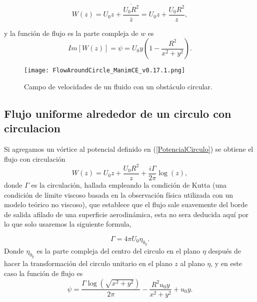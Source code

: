 \documentclass[12pt]{article}
\begin{document}
		\begin{equation}
			W(z) = U_0 z + \frac{\overline{U_0 R^2} }{\overline{z} } = U_0 z +\frac{U_0 R^2}{z} ,
			\label{PotencialCirculo}
		\end{equation}

		\noindent y la función de flujo es la parte compleja de $w$ es
		\begin{equation*}
			Im[W(z)]=\psi =  U_0 y \left( 1- \frac{R^2}{x^2 + y^2}\right).
			\label{Potencial}
		\end{equation*}
		\begin{figure}[H]
			\begin{small}
				\begin{center}
					\texttt{[image: FlowAroundCircle\_ManimCE\_v0.17.1.png]}
				\end{center}
				\caption{Campo de velocidades de un fluido con un obstáculo circular.}
			\end{small}
		\end{figure}
		
		\subsection{Flujo uniforme alrededor de un circulo con circulacion}
			Si agregamos un vórtice al potencial definido en (\ref{PotencialCirculo}) se obtiene el flujo con circulación
			\begin{equation}
				W(z) = U_0z + \frac{ U_0R^2}{z} + \frac{i \Gamma}{2 \pi}\log (z),
			\end{equation}
			donde  $\Gamma$ es la circulación, hallada empleando la condición de Kutta (una condición de límite viscoso basada en la observación física utilizada con un modelo teórico no viscoso), que establece que el flujo sale suavemente del borde de salida afilado de una superficie aerodinámica, esta no sera deducida aquí por lo que solo usaremos la siguiente formula,

			\begin{equation*}
				\Gamma=4 \pi U_0 \eta_{0_y}.
			\end{equation*}
			Donde $\eta_{0_y}$ es la parte compleja del centro del circulo en el plano $\eta$ después de hacer la transformación del circulo unitario en el plano $z$ al plano $\eta$, y en este caso la función de flujo es 
			\begin{equation*}
				\psi = \frac{\Gamma \log{\left(\sqrt{x^{2} + y^{2}} \right)}}{2 \pi} - \frac{R^{2} u_{0} y}{x^{2} + y^{2}} + u_{0} y.
			\end{equation*}
 
\end{document}
